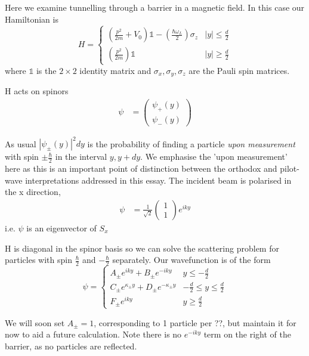 \documentclass{article}
\begin{document}
Here we examine tunnelling through a barrier in a magnetic field. In this case our Hamiltonian is
\begin{equation}
	H = 
	\begin{cases}
	\left(\frac{p^2}{2m} + V_0\right)\mathbb{1}-\left(\frac{\hbar \omega_L}{2}\right) \sigma_z & |y| \leq \frac{d}{2}\\
	\left(\frac{p^2}{2m}\right)\mathbb{1} & |y| \geq \frac{d}{2}
	\end{cases}
	\end{equation}
where $\mathbb{1}$ is the $2 \times 2$ identity matrix and $\sigma_{x}, \sigma_{y}, \sigma_{z}$ are the Pauli spin matrices.

H acts on spinors
\begin{align}
	\psi &= \begin{pmatrix}
		\psi_{+}(y) \\
		\psi_{-}(y)
		\end{pmatrix}
\end{align}

As usual $|\psi_{\pm}(y)|^{2}dy$ is the probability of finding a particle \textit{upon measurement} with spin $\pm \frac{\hbar}{2}$ in the interval $y, y+dy$. We emphasise the 'upon measurement' here as this is an important point of distinction between the orthodox and pilot-wave interpretations addressed in this essay. The incident beam is polarised in the x direction,
\begin{align}
	\psi &= \frac{1}{\sqrt{2}}
	\begin{pmatrix}
	1\\
	1
	\end{pmatrix}
	e^{i k y}
\end{align}
i.e. $\psi$ is an eigenvector of $S_{x}$

H is diagonal in the spinor basis so we can solve the scattering problem for particles with spin $\frac{\hbar}{2}$ and $-\frac{\hbar}{2}$ separately. 
Our wavefunction is of the form
\begin{equation}
	\psi = 
	\begin{cases}
		A_{\pm}e^{i k y} + B_{\pm}e^{-i k y} & y \leq -\frac{d}{2} \\
		C_{\pm}e^{\kappa_{\pm}y} + D_{\pm}e^{-\kappa_{\pm}y} & -\frac{d}{2} \leq y \leq \frac{d}{2} \\
		F_{\pm}e^{i k y} & y \geq \frac{d}{2}
	\end{cases}
\end{equation}

We will soon set $A_{\pm} = 1$, corresponding to 1 particle per ??, but maintain it for now to aid a future calculation. Note there is no $e^{-i k y}$ term on the right of the barrier, as no particles are reflected. 
\end{document}
